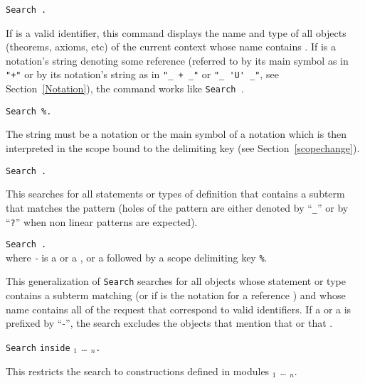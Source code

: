 \newcommand{\termpatternorstr}{{\termpattern}\textrm{\textsl{-}}{\str}}

\begin{Variants}
\item {\tt Search {\str}.}

If {\str} is a valid identifier, this command displays the name and type
of all objects (theorems, axioms, etc) of the current context whose
name contains {\str}. If {\str} is a notation's string denoting some
reference {\qualid} (referred to by its main symbol as in \verb="+"=
or by its notation's string as in \verb="_ + _"= or \verb="_ 'U' _"=, see
Section~\ref{Notation}), the command works like {\tt Search
{\qualid}}.

\item {\tt Search {\str}\%{\delimkey}.}

The string {\str} must be a notation or the main symbol of a notation
which is then interpreted in the scope bound to the delimiting key
{\delimkey} (see Section~\ref{scopechange}).

\item {\tt Search {\termpattern}.}

This searches for all statements or types of definition that contains
a subterm that matches the pattern {\termpattern} (holes of the
pattern are either denoted by ``{\texttt \_}'' or
by ``{\texttt ?{\ident}}'' when non linear patterns are expected).

\item {\tt Search \nelist{\zeroone{-}{\termpatternorstr}}{}.}\\

\noindent where {\termpatternorstr} is a
{\termpattern} or a {\str}, or a {\str} followed by a scope
delimiting key {\tt \%{\delimkey}}.

This generalization of {\tt Search} searches for all objects
whose statement or type contains a subterm matching {\termpattern} (or
{\qualid} if {\str} is the notation for a reference {\qualid}) and
whose name contains all {\str} of the request that correspond to valid
identifiers. If a {\termpattern} or a {\str} is prefixed by ``-'', the
search excludes the objects that mention that {\termpattern} or that
{\str}.

\item
  {\tt Search} \nelist{{\termpatternorstr}}{}
    {\tt inside} {\module$_1$} \ldots{} {\module$_n$}{\tt .}

This restricts the search to constructions defined in modules
{\module$_1$} \ldots{} {\module$_n$}.


\end{Variants}
